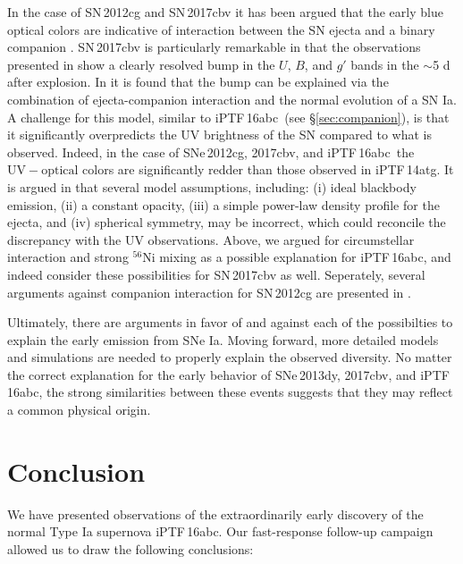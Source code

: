 \documentclass[twocolumn]{aastex61}
\newcommand{\abc}{iPTF\,16abc}
\begin{document}
In the case of SN\,2012cg and SN\,2017cbv it has been argued that the early blue optical colors are indicative of interaction between the SN ejecta and a binary companion \citep{2016ApJ...820...92M,2017arXiv170608990H}. SN\,2017cbv is particularly remarkable in that the observations presented in \citet{2017arXiv170608990H} show a clearly resolved bump in the $U$, $B$, and $g'$ bands in the $\sim$5 d after explosion. In \citeauthor{2017arXiv170608990H} it is found that the bump can be explained via the combination of ejecta-companion interaction and the normal evolution of a SN Ia. A challenge for this model, similar to \abc\ (see \S\ref{sec:companion}), is that it significantly overpredicts the UV brightness of the SN compared to what is observed. Indeed, in the case of SNe\,2012cg, 2017cbv, and \abc\ the $\mathrm{UV} - \mathrm{optical}$ colors are significantly redder than those observed in iPTF\,14atg. It is argued in \citet{2017arXiv170608990H} that several model assumptions, including: (i) ideal blackbody emission, (ii) a constant opacity, (iii) a simple power-law density profile for the ejecta, and (iv) spherical symmetry, may be incorrect, which could reconcile the discrepancy with the UV observations. Above, we argued for circumstellar interaction and strong $^{56}$Ni mixing as a possible explanation for \abc, and indeed \citet{2017arXiv170608990H} consider these possibilities for SN\,2017cbv as well. Seperately, several arguments against companion interaction for SN\,2012cg are presented in \citet{2016arXiv161007601S}. 

Ultimately, there are arguments in favor of and against each of the possibilties to explain the early emission from SNe Ia. Moving forward, more detailed models and simulations are needed to properly explain the observed diversity. No matter the correct explanation for the early behavior of SNe\,2013dy, 2017cbv, and \abc, the strong similarities between these events suggests that they may reflect a common physical origin. 

\section{Conclusion}
\label{sec:conclusion}

We have presented observations of the extraordinarily early discovery of the 
normal Type Ia supernova \abc. Our fast-response follow-up 
campaign allowed us to draw the following conclusions:
\end{document}
